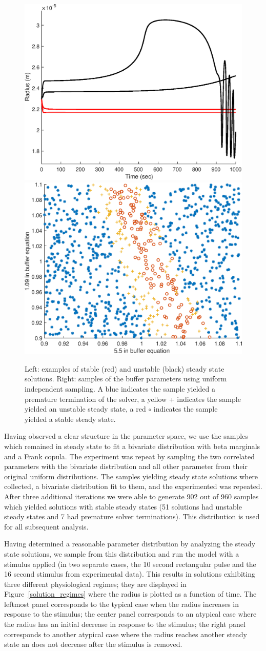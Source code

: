 \documentclass[12pt]{article}
\numberwithin{equation}{section}
\begin{document}
\begin{figure}[h]
\centering
\includegraphics[width=.4 \textwidth]{Figures/Steady_State_Curves.eps}
\includegraphics[width=.4 \textwidth]{Figures/First_Iteration_Samples.eps}
\caption{Left: examples of stable (red) and unstable (black) steady state solutions. Right: samples of the buffer parameters using uniform independent sampling. A blue \* indicates the sample yielded a premature termination of the solver, a yellow + indicates the sample yielded an unstable steady state, a red $\circ$ indicates the sample yielded a stable steady state.}
\vspace{-.5 cm}
\label{steady_states}
\end{figure}

Having observed a clear structure in the parameter space, we use the samples which remained in steady state to fit a bivariate distribution with beta marginals and a Frank copula. The experiment was repeat by sampling the two correlated parameters with the bivariate distribution and all other parameter from their original uniform distributions. The samples yielding steady state solutions where collected, a bivariate distribution fit to them, and the experimented was repeated. After three additional iterations we were able to generate 902 out of 960 samples which yielded solutions with stable steady states (51 solutions had unstable steady states and 7 had premature solver terminations). This distribution is used for all subsequent analysis.

Having determined a reasonable parameter distribution by analyzing the steady state solutions, we sample from this distribution and run the model with a stimulus applied (in two separate cases, the 10 second rectangular pulse and the 16 second stimulus from experimental data). This results in solutions exhibiting three different physiological regimes; they are displayed in Figure~\ref{solution_regimes} where the radius is plotted as a function of time. The leftmost panel corresponds to the typical case when the radius increases in response to the stimulus; the center panel corresponds to an atypical case where the radius has an initial decrease in response to the stimulus; the right panel corresponds to another atypical case where the radius reaches another steady state an does not decrease after the stimulus is removed.
\end{document}
